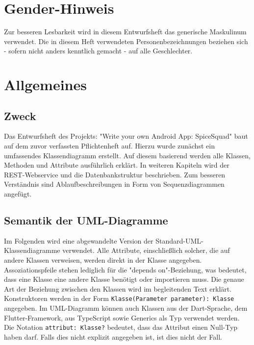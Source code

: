 \documentclass{entwurfsheft}
\begin{document}

\maketitle
\tableofcontents
\newpage

\section*{Gender-Hinweis}
Zur besseren Lesbarkeit wird in diesem Entwurfsheft das generische Maskulinum verwendet.
Die in diesem Heft verwendeten Personenbezeichnungen beziehen sich - sofern nicht anders kenntlich gemacht - auf alle Geschlechter.
\newpage

\section{Allgemeines}
\subsection{Zweck}
Das Entwurfsheft des Projekts: "Write your own Android App: SpiceSquad" baut auf dem zuvor verfassten Pflichtenheft auf.
Hierzu wurde zunächst ein umfassendes Klassendiagramm erstellt. Auf diesem basierend werden alle Klassen, Methoden und Attribute ausführlich erklärt.
In weiteren Kapiteln wird der REST-Webservice und die Datenbankstruktur beschrieben. Zum besseren Verständnis sind Ablaufbeschreibungen in Form von Sequenzdiagrammen angefügt.

\subsection{Semantik der UML-Diagramme}
Im Folgenden wird eine abgewandelte Version der Standard-UML-Klassendiagramme verwendet. Alle Attribute, einschließlich solcher, die auf andere Klassen verweisen, werden direkt in der Klasse angegeben. Assoziationspfeile stehen lediglich für die "depends on"-Beziehung, was bedeutet, dass eine Klasse eine andere Klasse benötigt oder importieren muss. Die genaue Art der Beziehung zwischen den Klassen wird im begleitenden Text erklärt. Konstruktoren werden in der Form \texttt{Klasse(Parameter parameter): Klasse} angegeben. Im UML-Diagramm können auch Klassen aus der Dart-Sprache, dem Flutter-Framework, aus TypeScript sowie Generics als Typ verwendet werden. Die Notation \texttt{attribut: Klasse?} bedeutet, dass das Attribut einen Null-Typ haben darf. Falls dies nicht explizit angegeben ist, ist dies nicht der Fall.
\end{document}
